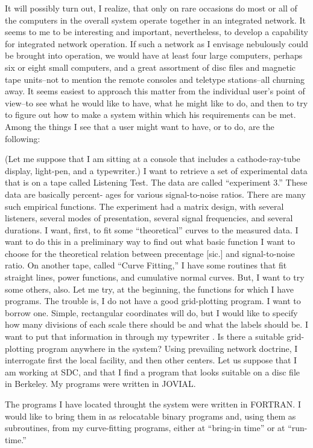 \documentclass{article}
\begin{document}
It will possibly turn out, I realize, that only on rare occasions do most or all of the computers in the overall system operate together in an integrated network. It seems to me to be interesting and important, nevertheless, to develop a capability for integrated network operation. If such a network as I envisage nebulously could be brought into operation, we would have at least four large computers, perhaps six or eight small computers, and a great assortment of disc files and magnetic tape units--not to mention the remote consoles and teletype stations--all churning away. It seems easiest to approach this matter from the individual user's point of view--to see what he would like to have, what he might like to do, and then to try to figure out how to make a system within which his requirements can be met. Among the things I see that a user might want to have, or to do, are the following:

(Let me suppose that I am sitting at a console that includes a cathode-ray-tube display, light-pen, and a typewriter.) I want to retrieve a set of experimental data that is on a tape called Listening Test. The data are called ``experiment 3.'' These data are basically percent- ages for various signal-to-noise ratios. There are many such empirical functions. The experiment had a matrix design, with several listeners, several modes of presentation, several signal frequencies, and several durations. I want, first, to fit some ``theoretical'' curves to the measured data. I want to do this in a preliminary way to find out what basic function I want to choose for the theoretical relation between precentage [sic.] and signal-to-noise ratio. On another tape, called ``Curve Fitting,'' I have some routines that fit straight lines, power functions, and cumulative normal curves. But, I want to try some others, also. Let me try, at the beginning, the functions for which I have programs. The trouble is, I do not have a good grid-plotting program. I want to borrow one. Simple, rectangular coordinates will do, but I would like to specify how many divisions of each scale there should be and what the labels should be. I want to put that information in through my typewriter . Is there a suitable grid-plotting program anywhere in the system? Using prevailing network doctrine, I interrogate first the local facility, and then other centers. Let us suppose that I am working at SDC, and that I find a program that looks suitable on a disc file in Berkeley. My programs were written in JOVIAL.

The programs I have located throught the system were written in FORTRAN. I would like to bring them in as relocatable binary programs and, using them as subroutines, from my curve-fitting programs, either at ``bring-in time'' or at ``run-time.''
\end{document}
